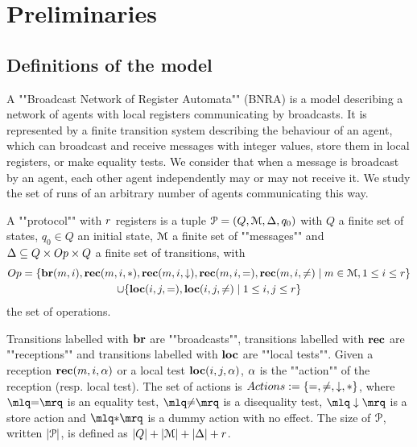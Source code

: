 \section{Preliminaries}
\label{sec:preliminaries}

\subsection{Definitions of the model}
A ""Broadcast Network of Register Automata"" (BNRA) \cite{DelzannoST13} is a model describing a network of agents with local registers communicating by broadcasts. It is represented by a finite transition system describing the behaviour of an agent, which can broadcast and receive messages with integer values, store them in local registers, or make equality tests. 
We consider that when a message is broadcast by an agent, each other agent independently may or may not receive it. 
We study the set of runs of an arbitrary number of agents communicating this way.

\begin{definition}[Protocols]
	A ""protocol"" with $r$ registers is a tuple $\mathcal{P} = (Q, \mathcal{M}, \Delta, q_0)$  with $Q$ a finite set of states, $q_0 \in Q$ an initial state, $\mathcal{M}$ a finite set of ""messages""  and $\transitions \subseteq Q \times \operations \times Q$ a finite set of transitions, with 
	\begin{multline*}
	\operations = \set{\br{\amessage}{i}, \rec{\amessage}{i}{\dummyact}, \rec{\amessage}{i}{\enregact}, \rec{\amessage}{i}{\eqtestact}, \rec{\amessage}{i}{\diseqtestact} \mid \amessage \in \messages, 1 \leq i \leq \regnum} \\ \cup  
	\set{\loc{i}{j}{\eqtestact}, \loc{i}{j}{\diseqtestact} \mid 1 \leq i,j \leq \regnum}
	\end{multline*}
	the set of operations.
	
	Transitions labelled with $\textbf{br}$ are ""broadcasts"", transitions labelled with $\textbf{rec}$ are ""receptions"" and transitions labelled with $\textbf{loc}$ are ""local tests"".
	Given a reception $\textbf{rec}(m, i, \alpha)$ or a local test $\textbf{loc}(i,j,\alpha)$, $\alpha$ is the ""action"" of the reception (resp. local test). 
The set of actions is $\actions := \set{\eqtestact, \diseqtestact, \enregact, \dummyact}$, where 
$\quotemarks{\eqtestact}$ is an equality test, $\quotemarks{\diseqtestact}$ is a disequality test, $\quotemarks{\enregact}$ is a store action and $\quotemarks{\dummyact}$ is a dummy action with no effect.
The size of $\mathcal{P}$, written $|\mathcal{P}|$, is defined as $|Q| + |\mathcal{M}| + |\Delta| + r$.
\end{definition}



